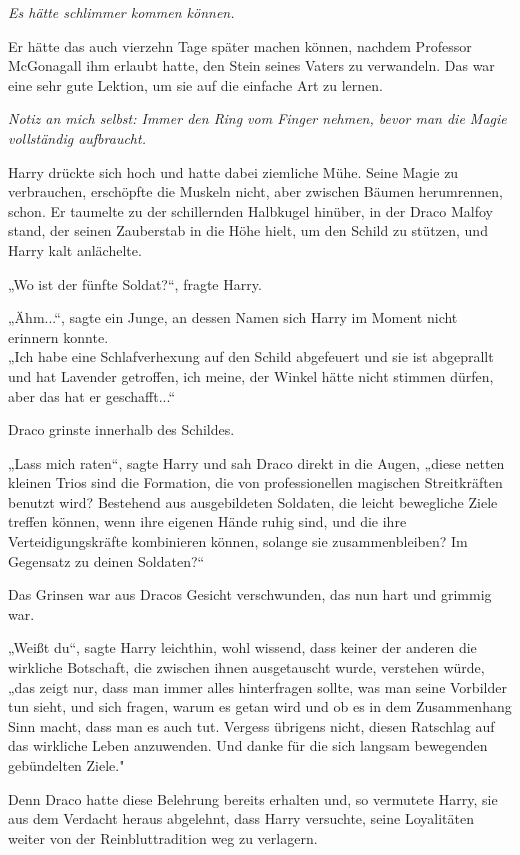 {\emph{Es hätte schlimmer kommen können.}

Er hätte das auch vierzehn Tage später machen können, nachdem Professor McGonagall ihm erlaubt hatte, den Stein seines Vaters zu verwandeln. Das war eine sehr gute Lektion, um sie auf die einfache Art zu lernen.

\emph{Notiz an mich selbst: Immer den Ring vom Finger nehmen, bevor man die Magie vollständig aufbraucht.}

Harry drückte sich hoch und hatte dabei ziemliche Mühe. Seine Magie zu verbrauchen, erschöpfte die Muskeln nicht, aber zwischen Bäumen herumrennen, schon. Er taumelte zu der schillernden Halbkugel hinüber, in der Draco Malfoy stand, der seinen Zauberstab in die Höhe hielt, um den Schild zu stützen, und Harry kalt anlächelte.

„Wo ist der fünfte Soldat?“, fragte Harry.

„Ähm...“, sagte ein Junge, an dessen Namen sich Harry im Moment nicht erinnern konnte.\\ „Ich habe eine Schlafverhexung auf den Schild abgefeuert und sie ist abgeprallt und hat Lavender getroffen, ich meine, der Winkel hätte nicht stimmen dürfen, aber das hat er geschafft...“

Draco grinste innerhalb des Schildes.

„Lass mich raten“, sagte Harry und sah Draco direkt in die Augen, „diese netten kleinen Trios sind die Formation, die von professionellen magischen Streitkräften benutzt wird? Bestehend aus ausgebildeten Soldaten, die leicht bewegliche Ziele treffen können, wenn ihre eigenen Hände ruhig sind, und die ihre Verteidigungskräfte kombinieren können, solange sie zusammenbleiben? Im Gegensatz zu deinen Soldaten?“

Das Grinsen war aus Dracos Gesicht verschwunden, das nun hart und grimmig war.

„Weißt du“, sagte Harry leichthin, wohl wissend, dass keiner der anderen die wirkliche Botschaft, die zwischen ihnen ausgetauscht wurde, verstehen würde, „das zeigt nur, dass man immer alles hinterfragen sollte, was man seine Vorbilder tun sieht, und sich fragen, warum es getan wird und ob es in dem Zusammenhang Sinn macht, dass man es auch tut. Vergess übrigens nicht, diesen Ratschlag auf das wirkliche Leben anzuwenden. Und danke für die sich langsam bewegenden gebündelten Ziele."

Denn Draco hatte diese Belehrung bereits erhalten und, so vermutete Harry, sie aus dem Verdacht heraus abgelehnt, dass Harry versuchte, seine Loyalitäten weiter von der Reinbluttradition weg zu verlagern.

}
